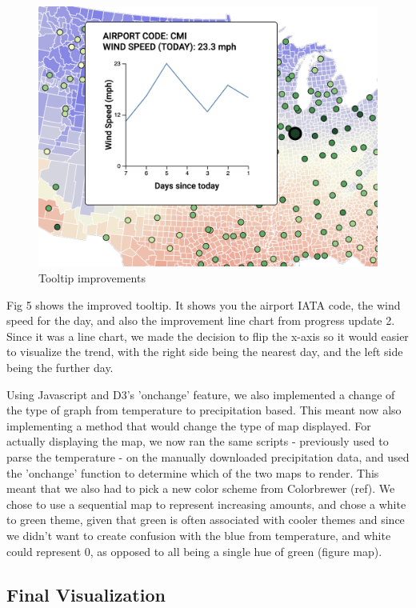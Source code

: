 \documentclass[9pt,twocolumn,twoside]{opticajnl}
\begin{document}
\begin{figure}
    \centering
    \includegraphics[scale=0.4]{images/img6.png}
    \caption{Tooltip improvements}
\end{figure}

Fig 5 shows the improved tooltip. It shows you the airport IATA code, the wind speed for the day, and also the improvement line chart from progress update 2. Since it was a line chart, we made the decision to flip the x-axis so it would easier to visualize the trend, with the right side being the nearest day, and the left side being the further day.

Using Javascript and D3's 'onchange' feature, we also implemented a change of the type of graph from temperature to precipitation based. This meant now also implementing a method that would change the type of map displayed. For actually displaying the map, we now ran the same scripts - previously used to parse the temperature - on the manually downloaded precipitation data, and used the 'onchange' function to determine which of the two maps to render. This meant that we also had to pick a new color scheme from Colorbrewer (ref). We chose to use a sequential map to represent increasing amounts, and chose a white to green theme, given that green is often associated with cooler themes and since we didn't want to create confusion with the blue from temperature, and white could represent 0, as opposed to all being a single hue of green (figure map). 

\subsection {Final Visualization}
\end{document}
